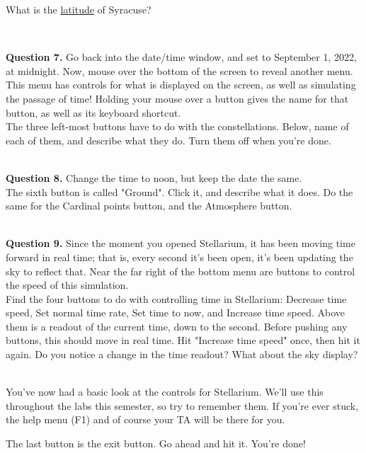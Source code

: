 \documentclass[11pt]{article}
\begin{document}
What is the \underline{latitude} of Syracuse?\\
\vspace*{1.5cm}

\hrulefill\\

\newpage

\textbf{Question 7.} Go back into the date/time window, and set to September 1, 2022, at midnight. Now, mouse over the bottom of the screen to reveal another menu. This menu has controls for what is displayed on the screen, as well as simulating the passage of time! Holding your mouse over a button gives the name for that button, as well as its keyboard shortcut.\\

The three left-most buttons have to do with the constellations. Below, name of each of them, and describe what they do. Turn them off when you're done. \\
\vspace*{1.5cm}

\hrulefill\\   

\textbf{Question 8.} Change the time to noon, but keep the date the same.\\

The sixth button is called "Ground". Click it, and describe what it does. Do the same for the Cardinal points button, and the Atmosphere button.
\vspace*{1.5cm}

\hrulefill\\ 

\textbf{Question 9.} Since the moment you opened Stellarium, it has been moving time forward in real time; that is, every second it's been open, it's been updating the sky to reflect that. Near the far right of the bottom menu are buttons to control the speed of this simulation. \\

Find the four buttons to do with controlling time in Stellarium: Decrease time speed, Set normal time rate, Set time to now, and Increase time speed. Above them is a readout of the current time, down to the second. Before pushing any buttons, this should move in real time. Hit "Increase time speed" once, then hit it again. Do you notice a change in the time readout? What about the sky display?
\vspace*{1.5cm}

\hrulefill\\

You've now had a basic look at the controls for Stellarium. We'll use this throughout the labs this semester, so try to remember them. If you're ever stuck, the help menu (F1) and of course your TA will be there for you.

The last button is the exit button. Go ahead and hit it. You're done!
\end{document}
